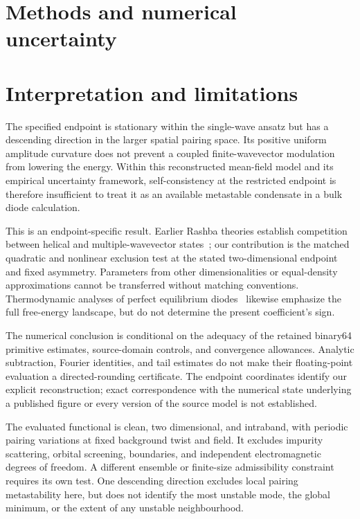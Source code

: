 \documentclass[11pt,a4paper]{article}
\begin{document}


\section{Methods and numerical uncertainty}\label{sec:methods}


\section{Interpretation and limitations}
The specified endpoint is stationary within the single-wave ansatz but has a descending direction in the larger spatial pairing space. Its positive uniform amplitude curvature does not prevent a coupled finite-wavevector modulation from lowering the energy. Within this reconstructed mean-field model and its empirical uncertainty framework, self-consistency at the restricted endpoint is therefore insufficient to treat it as an available metastable condensate in a bulk diode calculation.

This is an endpoint-specific result. Earlier Rashba theories establish competition between helical and multiple-wavevector states~\cite{Agterberg2007,Dimitrova2007}; our contribution is the matched quadratic and nonlinear exclusion test at the stated two-dimensional endpoint and fixed asymmetry. Parameters from other dimensionalities or equal-density approximations cannot be transferred without matching conventions. Thermodynamic analyses of perfect equilibrium diodes~\cite{Hosur2026} likewise emphasize the full free-energy landscape, but do not determine the present coefficient's sign.

The numerical conclusion is conditional on the adequacy of the retained binary64 primitive estimates, source-domain controls, and convergence allowances. Analytic subtraction, Fourier identities, and tail estimates do not make their floating-point evaluation a directed-rounding certificate. The endpoint coordinates identify our explicit reconstruction; exact correspondence with the numerical state underlying a published figure or every version of the source model is not established.

The evaluated functional is clean, two dimensional, and intraband, with periodic pairing variations at fixed background twist and field. It excludes impurity scattering, orbital screening, boundaries, and independent electromagnetic degrees of freedom. A different ensemble or finite-size admissibility constraint requires its own test. One descending direction excludes local pairing metastability here, but does not identify the most unstable mode, the global minimum, or the extent of any unstable neighbourhood.
\end{document}
